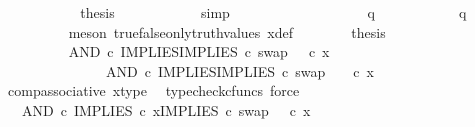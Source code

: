 \begin{isabellebody}
\ \ \ \ \ \ \ \ \isamarkupfalse%
\ \isamarkupfalse%
\ {\isacharquery}{\kern0pt}thesis\isanewline
\ \ \ \ \ \ \ \ \ \ \isamarkupfalse%
\ simp\isanewline
\ \ \ \ \ \ \isamarkupfalse%
\isanewline
\ \ \ \ \isamarkupfalse%
\isanewline
\ \ \ \ \ \ \isamarkupfalse%
\ {\isachardoublequoteopen}q\ {\isasymnoteq}\ {\isasymt}{\isachardoublequoteclose}\isanewline
\ \ \ \ \ \ \isamarkupfalse%
\ \isamarkupfalse%
\ {\isachardoublequoteopen}q\ {\isacharequal}{\kern0pt}\ {\isasymf}{\isachardoublequoteclose}\isanewline
\ \ \ \ \ \ \ \ \isamarkupfalse%
\ {\isacharparenleft}{\kern0pt}meson\ true{\isacharunderscore}{\kern0pt}false{\isacharunderscore}{\kern0pt}only{\isacharunderscore}{\kern0pt}truth{\isacharunderscore}{\kern0pt}values\ x{\isacharunderscore}{\kern0pt}def{\isacharparenright}{\kern0pt}\isanewline
\ \ \ \ \ \ \isamarkupfalse%
\ {\isacharquery}{\kern0pt}thesis\isanewline
\ \ \ \ \ \ \isamarkupfalse%
\ {\isacharminus}{\kern0pt}\ \isanewline
\ \ \ \ \ \ \ \ \isamarkupfalse%
\ {\isachardoublequoteopen}{\isacharparenleft}{\kern0pt}AND\ {\isasymcirc}\isactrlsub c\ {\isasymlangle}IMPLIES{\isacharcomma}{\kern0pt}IMPLIES\ {\isasymcirc}\isactrlsub c\ swap\ {\isasymOmega}\ {\isasymOmega}{\isasymrangle}{\isacharparenright}{\kern0pt}\ {\isasymcirc}\isactrlsub c\ x\ {\isacharequal}{\kern0pt}\ \ \ \ \isanewline
\ \ \ \ \ \ \ \ \ \ \ \ \ \ \ AND\ {\isasymcirc}\isactrlsub c\ {\isasymlangle}IMPLIES{\isacharcomma}{\kern0pt}IMPLIES\ {\isasymcirc}\isactrlsub c\ swap\ {\isasymOmega}\ {\isasymOmega}{\isasymrangle}\ \ {\isasymcirc}\isactrlsub c\ x{\isachardoublequoteclose}\isanewline
\ \ \ \ \ \ \ \ \ \ \isamarkupfalse%
\ comp{\isacharunderscore}{\kern0pt}associative{}\ x{\isacharunderscore}{\kern0pt}type\ \isamarkupfalse%
\ {\isacharparenleft}{\kern0pt}typecheck{\isacharunderscore}{\kern0pt}cfuncs{\isacharcomma}{\kern0pt}\ force{\isacharparenright}{\kern0pt}\isanewline
\ \ \ \ \ \ \ \ \isamarkupfalse%
\ \isamarkupfalse%
\ {\isachardoublequoteopen}{\isachardot}{\kern0pt}{\isachardot}{\kern0pt}{\isachardot}{\kern0pt}\ {\isacharequal}{\kern0pt}\ AND\ {\isasymcirc}\isactrlsub c\ {\isasymlangle}IMPLIES\ {\isasymcirc}\isactrlsub c\ x{\isacharcomma}{\kern0pt}IMPLIES\ {\isasymcirc}\isactrlsub c\ swap\ {\isasymOmega}\ {\isasymOmega}\ {\isasymcirc}\isactrlsub c\ x{\isasymrangle}{\isachardoublequoteclose}\isanewline
\ \ \ \ \ \ \ \ \ \ \isamarkupfalse%

\end{isabellebody}
